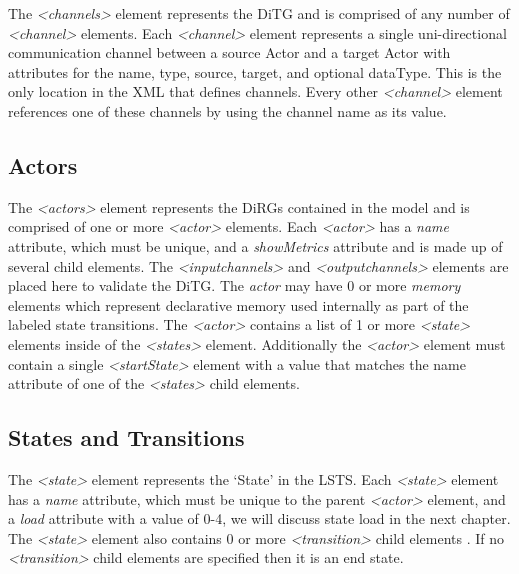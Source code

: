 The {\em \textless channels\textgreater} element represents the DiTG and is comprised of any number of {\em \textless channel\textgreater} elements.  Each {\em \textless channel\textgreater} element represents a single uni-directional communication channel between a source Actor and a target Actor with attributes for the name, type, source, target, and optional dataType.  This is the only location in the XML that defines channels.  Every other {\em \textless channel\textgreater} element references one of these channels by using the channel name as its value.

\begin{spacing}{.5}

\end{spacing}

\subsection{Actors}

The {\em \textless actors\textgreater} element represents the DiRGs contained in the model and is comprised of one or more {\em \textless actor\textgreater} elements.  Each {\em \textless actor\textgreater} has a {\em name} attribute, which must be unique, and a {\em showMetrics} attribute and is made up of several child elements.  The {\em \textless inputchannels\textgreater} and {\em \textless outputchannels\textgreater} elements are placed here to validate the DiTG.  The {\em actor} may have 0 or more {\em memory} elements which represent declarative memory used internally as part of the labeled state transitions.  The {\em \textless actor\textgreater} contains a list of 1 or more {\em \textless state\textgreater} elements inside of the {\em \textless states\textgreater} element.  Additionally the {\em \textless actor\textgreater} element must contain a single {\em \textless startState\textgreater} element with a value that matches the name attribute of one of the {\em \textless states\textgreater} child elements.

\begin{spacing}{.5}

\end{spacing}


\subsection{States and Transitions}

The {\em \textless state\textgreater} element represents the `State' in the LSTS.  Each {\em \textless state\textgreater} element has a {\em name} attribute, which must be unique to the parent {\em \textless actor\textgreater} element, and a {\em load} attribute with a value of 0-4, we will discuss state load in the next chapter.  The {\em \textless state\textgreater} element also contains 0 or more {\em \textless transition\textgreater} child elements .  If no {\em \textless transition\textgreater} child elements are specified then it is an end state.  

